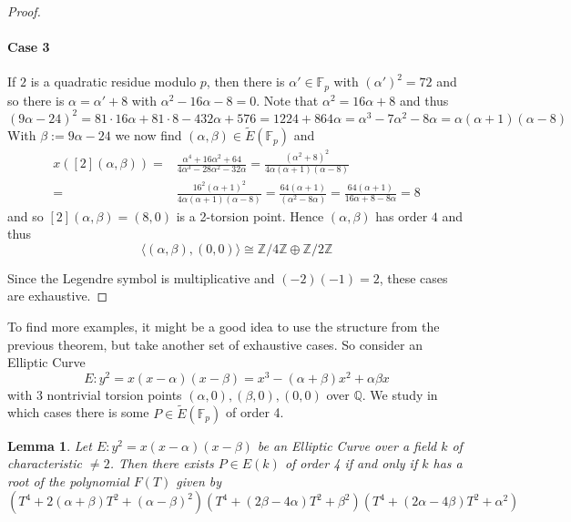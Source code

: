 \documentclass{scrartcl}
\newcommand{\Z}{\mathbb{Z}}
\newcommand{\F}{\mathbb{F}}
\newcommand{\Q}{\mathbb{Q}}
\newtheorem{lemma}[prop]{Lemma}
\theoremstyle{definition}
\begin{document}
\begin{proof}
    \paragraph{Case 3} If $2$ is a quadratic residue modulo $p$, then there is $\alpha' \in \F_p$ with $(\alpha')^2 = 72$ and so there is $\alpha = \alpha' + 8$ with $\alpha^2 - 16\alpha - 8 = 0$.
    Note that $\alpha^2 = 16\alpha + 8$ and thus
    \begin{equation*}
        (9\alpha - 24)^2 = 81 \cdot 16 \alpha + 81 \cdot 8 - 432 \alpha + 576 = 1224 + 864\alpha = \alpha^3 - 7\alpha^2 - 8\alpha= \alpha (\alpha + 1) (\alpha - 8)
    \end{equation*}
    With $\beta := 9\alpha - 24$ we now find $(\alpha, \beta) \in \tilde{E}(\F_p)$ and
    \begin{align*}
        x([2](\alpha, \beta)) =& \frac {\alpha^4 + 16 \alpha^2 + 64} {4\alpha^3 - 28\alpha^2 - 32\alpha} = \frac {(\alpha^2 + 8)^2} {4\alpha(\alpha + 1)(\alpha - 8)} \\
        =& \frac {16^2(\alpha + 1)^2} {4\alpha(\alpha + 1)(\alpha - 8)} = \frac {64 (\alpha + 1)} {(\alpha^2 - 8\alpha)} = \frac {64 (\alpha + 1)} {16\alpha + 8 - 8\alpha} = 8
    \end{align*}
    and so $[2](\alpha, \beta) = (8, 0)$ is a 2-torsion point.
    Hence $(\alpha, \beta)$ has order $4$ and thus
    \begin{equation*}
        \langle (\alpha, \beta), (0, 0) \rangle \cong \Z/4\Z \oplus \Z/2\Z
    \end{equation*}

    Since the Legendre symbol is multiplicative and $(-2)(-1) = 2$, these cases are exhaustive.
\end{proof}
To find more examples, it might be a good idea to use the structure from the previous theorem, but take another set of exhaustive cases.
So consider an Elliptic Curve
\begin{equation*}
    E: y^2 = x(x - \alpha)(x - \beta) = x^3 - (\alpha + \beta)x^2 + \alpha \beta x
\end{equation*}
with 3 nontrivial torsion points $(\alpha, 0), (\beta, 0), (0, 0)$ over $\Q$.
We study in which cases there is some $P \in \tilde{E}(\F_p)$ of order 4.
\begin{lemma}
    Let $E: y^2 = x(x - \alpha)(x - \beta)$ be an Elliptic Curve over a field $k$ of characteristic $\neq 2$.
    Then there exists $P \in E(k)$ of order 4 if and only if $k$ has a root of the polynomial $F(T)$ given by
    \begin{equation*}
        \left(T^4 + 2(\alpha + \beta)T^2 + (\alpha - \beta)^2\right)\left(T^4 + (2\beta - 4\alpha)T^2 + \beta^2\right)\left(T^4 + (2\alpha - 4\beta)T^2 + \alpha^2\right)
    \end{equation*}
\end{lemma}
\end{document}
